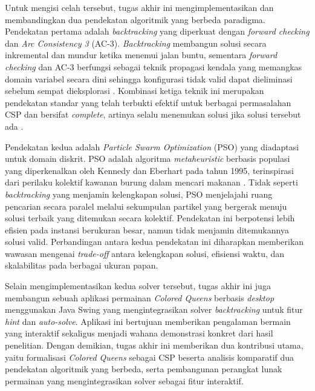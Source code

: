 Untuk mengisi celah tersebut, tugas akhir ini mengimplementasikan dan membandingkan dua pendekatan algoritmik yang berbeda paradigma. Pendekatan pertama adalah \textit{backtracking} yang diperkuat dengan \textit{forward checking} dan \textit{Arc Consistency 3} (AC-3). \textit{Backtracking} membangun solusi secara inkremental dan mundur ketika menemui jalan buntu, sementara \textit{forward checking} dan AC-3 berfungsi sebagai teknik propagasi kendala yang memangkas domain variabel secara dini sehingga konfigurasi tidak valid dapat dieliminasi sebelum sempat dieksplorasi \cite{russell2020artificial}. Kombinasi ketiga teknik ini merupakan pendekatan standar yang telah terbukti efektif untuk berbagai permasalahan CSP dan bersifat \textit{complete}, artinya selalu menemukan solusi jika solusi tersebut ada \cite{van2006backtracking}.

Pendekatan kedua adalah \textit{Particle Swarm Optimization} (PSO) yang diadaptasi untuk domain diskrit. PSO adalah algoritma \textit{metaheuristic} berbasis populasi yang diperkenalkan oleh Kennedy dan Eberhart pada tahun 1995, terinspirasi dari perilaku kolektif kawanan burung dalam mencari makanan \cite{kennedy1995particle}. Tidak seperti \textit{backtracking} yang menjamin kelengkapan solusi, PSO menjelajahi ruang pencarian secara paralel melalui sekumpulan partikel yang bergerak menuju solusi terbaik yang ditemukan secara kolektif. Pendekatan ini berpotensi lebih efisien pada instansi berukuran besar, namun tidak menjamin ditemukannya solusi valid. Perbandingan antara kedua pendekatan ini diharapkan memberikan wawasan mengenai \textit{trade-off} antara kelengkapan solusi, efisiensi waktu, dan skalabilitas pada berbagai ukuran papan.

Selain mengimplementasikan kedua solver tersebut, tugas akhir ini juga membangun sebuah aplikasi permainan \textit{Colored Queens} berbasis \textit{desktop} menggunakan Java Swing yang mengintegrasikan solver \textit{backtracking} untuk fitur \textit{hint} dan \textit{auto-solve}. Aplikasi ini bertujuan memberikan pengalaman bermain yang interaktif sekaligus menjadi wahana demonstrasi konkret dari hasil penelitian. Dengan demikian, tugas akhir ini memberikan dua kontribusi utama, yaitu formalisasi \textit{Colored Queens} sebagai CSP beserta analisis komparatif dua pendekatan algoritmik yang berbeda, serta pembangunan perangkat lunak permainan yang mengintegrasikan solver sebagai fitur interaktif.


